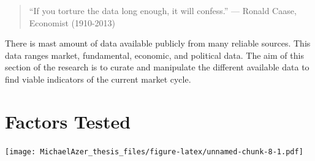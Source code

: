 \documentclass[]{book}
\begin{document}
\begin{quote}
``If you torture the data long enough, it will confess.''
\hfill --- Ronald Caase, Economist (1910-2013)
\end{quote}

There is mast amount of data available publicly from many reliable sources. This data ranges market, fundamental, economic, and political data. The aim of this section of the research is to curate and manipulate the different available data to find viable indicators of the current market cycle.

\hypertarget{factors-tested}{%
\section{Factors Tested}\label{factors-tested}}

\texttt{[image: MichaelAzer\_thesis\_files/figure-latex/unnamed-chunk-8-1.pdf]}
\end{document}
